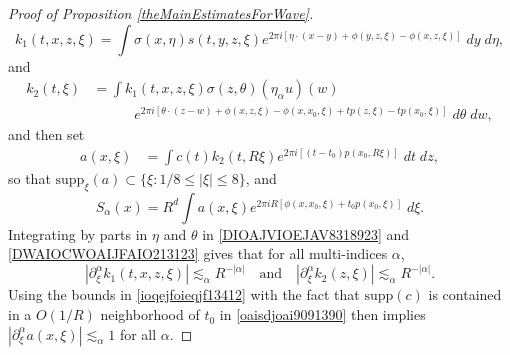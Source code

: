 \begin{proof}[Proof of Proposition \ref{theMainEstimatesForWave}]
%
\begin{equation} \label{DIOAJVIOEJAV8318923}
    k_1(t,x,z,\xi) = \int \sigma(x,\eta) s(t,y,z,\xi) e^{2 \pi i [ \eta \cdot (x - y) + \phi(y,z,\xi) - \phi(x,z,\xi) ]}\; dy\; d\eta,
\end{equation}
%
and
%
\begin{equation} \label{DWAIOCWOAIJFAIO213123}
\begin{split}
    k_2(t,\xi) &= \int k_1(t,x,z,\xi) \sigma(z,\theta) (\eta_\alpha u)(w)\\
    &\quad\quad\quad e^{2 \pi i [ \theta \cdot (z - w) + \phi(x,z,\xi) - \phi(x,x_0,\xi) + t p(z,\xi) - t p(x_0,\xi) ]}\; d\theta\; dw,
\end{split}
\end{equation}
%
and then set
%
\begin{equation} \label{oaisdjoai9091390}
\begin{split}
    a(x,\xi) &= \int c(t) k_2(t,R \xi) e^{2 \pi i [ (t - t_0) p(x_0, R \xi) ]} \; dt\; dz,
\end{split}
\end{equation}
%
so that $\text{supp}_\xi(a) \subset \{ \xi : 1/8 \leq |\xi| \leq 8 \}$, and
%
\begin{equation}
    S\!_\alpha(x) = R^d \int a(x, \xi) e^{2 \pi i R [ \phi(x,x_0,\xi) + t_0 p(x_0,\xi) ]}\; d\xi.
\end{equation}
%
Integrating by parts in $\eta$ and $\theta$ in \eqref{DIOAJVIOEJAV8318923} and \eqref{DWAIOCWOAIJFAIO213123} gives that for all multi-indices $\alpha$,
%
\begin{equation} \label{ioqejfoieqjf13412}
    |\partial_\xi^\alpha k_1(t,x,z,\xi)| \lesssim_\alpha R^{-|\alpha|} \quad\text{and}\quad |\partial_\xi^\alpha k_2(z,\xi)| \lesssim_{\alpha} R^{-|\alpha|}.
\end{equation}
%
Using the bounds in \eqref{ioqejfoieqjf13412} with the fact that $\text{supp}(c)$ is contained in a $O(1/R)$ neighborhood of $t_0$ in \eqref{oaisdjoai9091390} then implies $|\partial_\xi^\alpha a(x,\xi)| \lesssim_\alpha 1$ for all $\alpha$.
%
%
%
%
%


\end{proof}
